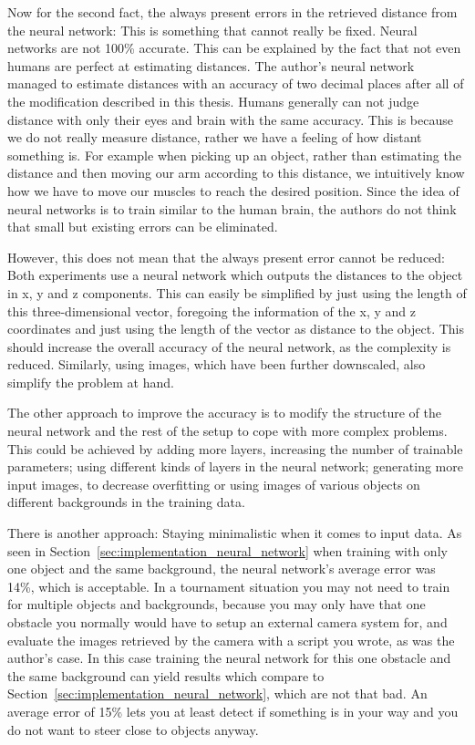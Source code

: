Now for the second fact, the always present errors in the retrieved distance from the neural network: This is something that cannot really be fixed. Neural networks are not 100\% accurate. This can be explained by the fact that not even humans are perfect at estimating distances. The author's neural network managed to estimate distances with an accuracy of two decimal places after all of the modification described in this thesis. Humans generally can not judge distance with only their eyes and brain with the same accuracy. This is because we do not really measure distance, rather we have a feeling of how distant something is. For example when picking up an object, rather than estimating the distance and then moving our arm according to this distance, we intuitively know how we have to move our muscles to reach the desired position. Since the idea of neural networks is to train similar to the human brain, the authors do not think that small but existing errors can be eliminated. 

However, this does not mean that the always present error cannot be reduced: Both experiments use a neural network which outputs the distances to the object in x, y and z components. This can easily be simplified by just using the length of this three-dimensional vector, foregoing the information of the x, y and z coordinates and just using the length of the vector as distance to the object. This should increase the overall accuracy of the neural network, as the complexity is reduced. Similarly, using images, which have been further downscaled, also simplify the problem at hand.

The other approach to improve the accuracy is to modify the structure of the neural network and the rest of the setup to cope with more complex problems. This could be achieved by adding more layers, increasing the number of trainable parameters; using different kinds of layers in the neural network; generating more input images, to decrease overfitting or using images of various objects on different backgrounds in the training data.

There is another approach: Staying minimalistic when it comes to input data. As seen in Section~\ref{sec:implementation_neural_network} when training with only one object and the same background, the neural network's average error was 14\%, which is acceptable. In a tournament situation you may not need to train for multiple objects and backgrounds, because you may only have that one obstacle you normally would have to setup an external camera system for, and evaluate the images retrieved by the camera with a script you wrote, as was the author's case. In this case training the neural network for this one obstacle and the same background can yield results which compare to Section~\ref{sec:implementation_neural_network}, which are not that bad. An average error of 15\% lets you at least detect if something is in your way and you do not want to steer close to objects anyway.


